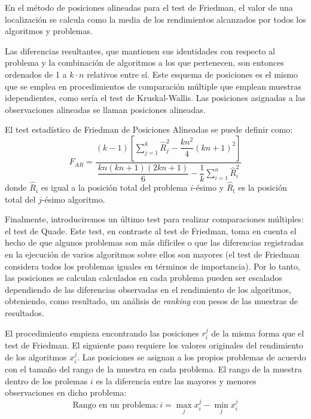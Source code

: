 En el método de posiciones alineadas para el test de Friedman, el valor de una localización se calcula como la media de los rendimientos alcanzados por todos los algoritmos y problemas. 

Las diferencias resultantes, que mantienen sus identidades con respecto al problema y la combinación de algoritmos a los que pertenecen, son entonces ordenados de 1 a $k\cdot n$ relativos entre sí. 
Este esquema de posiciones es el mismo que se emplea en procedimientos de comparación múltiple que emplean muestras idependientes, como sería el test de Kruskal-Wallis. 
Las posiciones asignadas a las observaciones alineadas se llaman posiciones alineadas. 

El test estadístico de Friedman de Posiciones Alineadas se puede definir como:
\begin{equation}
F_{AR} = \dfrac{(k-1)\left[ \sum_{j=1}^k \hat{R}^2_j - \dfrac{kn^2}{4}(kn+1)^2 \right]}{\dfrac{kn(kn+1)(2kn+1)}{6} - \dfrac{1}{k}\sum_{i=1}^n \hat{R}_i^2} 
\label{eq:4.37}
\end{equation}
donde $\hat{R}_i$ es igual a la posición total del problema $i$-ésimo y $\hat{R}_t$ es la posición total del $j$-ésimo algoritmo. 

Finalmente, introduciremos un último test para realizar comparaciones múltiples: el test de Quade. 
Este test, en contraste al test de Friedman, toma en cuenta el hecho de que algunos problemas son más difíciles o que las diferencias registradas en la ejecución de varios algoritmos sobre ellos son mayores (el test de Friedman considera todos los problemas iguales en términos de importancia). 
Por lo tanto, las posiciones se calculan calculados en cada problema pueden ser escalados dependiendo de las diferencias observadas en el rendimiento de los algoritmos, obteniendo, como resultado, un análisis de \textit{ranking} con pesos de las muestras de resultados. 

El procedimiento empieza encontrando las posiciones $r_i^j$ de la misma forma que el test de Friedman. 
El siguiente paso requiere los valores originales del rendimiento de los algoritmos $x_i^j$. 
Las posiciones se asignan a los propios problemas de acuerdo con el tamaño del rango de la muestra en cada problema. 
El rango de la muestra dentro de los prolemas $i$ es la diferencia entre las mayores y menores observaciones en dicho problema:
\begin{equation}
\text{Rango en un problema}: i = \max_j x_i^j - \min_j x^j_i
\label{eq:4.38}
\end{equation}

